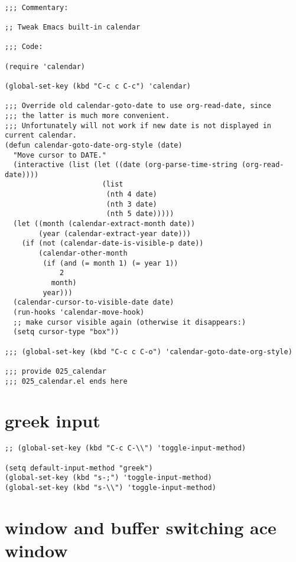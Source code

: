 \documentclass[11pt]{article}
\begin{document}
\begin{verbatim}

;;; Commentary:

;; Tweak Emacs built-in calendar

;;; Code:

(require 'calendar)

(global-set-key (kbd "C-c c C-c") 'calendar)

;;; Override old calendar-goto-date to use org-read-date, since
;;; the latter is much more convenient.
;;; Unfortunately will not work if new date is not displayed in current calendar.
(defun calendar-goto-date-org-style (date)
  "Move cursor to DATE."
  (interactive (list (let ((date (org-parse-time-string (org-read-date))))
                       (list
                        (nth 4 date)
                        (nth 3 date)
                        (nth 5 date)))))
  (let ((month (calendar-extract-month date))
        (year (calendar-extract-year date)))
    (if (not (calendar-date-is-visible-p date))
        (calendar-other-month
         (if (and (= month 1) (= year 1))
             2
           month)
         year)))
  (calendar-cursor-to-visible-date date)
  (run-hooks 'calendar-move-hook)
  ;; make cursor visible again (otherwise it disappears:)
  (setq cursor-type "box"))

;;; (global-set-key (kbd "C-c c C-o") 'calendar-goto-date-org-style)

;;; provide 025_calendar
;;; 025_calendar.el ends here
\end{verbatim}

\section{greek input}
\label{sec:org8cae27c}

\begin{verbatim}
;; (global-set-key (kbd "C-c C-\\") 'toggle-input-method)

(setq default-input-method "greek")
(global-set-key (kbd "s-;") 'toggle-input-method)
(global-set-key (kbd "s-\\") 'toggle-input-method)

\end{verbatim}

\section{window and buffer switching ace window}
\label{sec:org06945b9}
\end{document}
